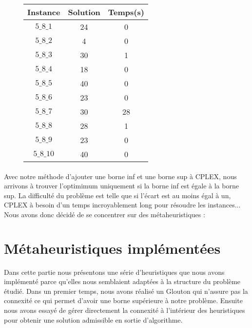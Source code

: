 \documentclass[a4paper, 11pt]{article} %
\begin{document}
\begin{center}
  \begin{figure}[H]
    \begin{tabular}{|c|c|c|}
      \hline 
      Instance & Solution & Temps(s) \\ \hline
      $5\_8\_1$ & 24 & 0 \\ \hline
      $5\_8\_2$ & 4 & 0 \\ \hline
      $5\_8\_3$ & 30 & 1 \\ \hline
      $5\_8\_4$ & 18 & 0 \\ \hline
      $5\_8\_5$ & 40 & 0 \\ \hline
      $5\_8\_6$ & 23 & 0 \\ \hline
      $5\_8\_7$ & 30 & 28 \\ \hline
      $5\_8\_8$ & 28 & 1 \\ \hline
      $5\_8\_9$ & 23 & 0 \\ \hline
      $5\_8\_10$  & 40 & 0 \\ \hline
      \end{tabular}
    \end{figure}
\end{center}


\paragraph*{}
Avec notre méthode d'ajouter une borne inf et une borne sup à CPLEX, nous arrivons à trouver l'optimimum uniquement si la borne inf est égale à la borne sup. La difficulté du problème est telle que si l'écart est au moins égal à un, CPLEX à besoin d'un temps incroyablement long pour résoudre les instances... Nous avons donc décidé de se concentrer sur des métaheuristiques :

\section{Métaheuristiques implémentées}

\paragraph*{}
Dans cette partie nous présentons une série d'heuristiques que nous avons implémenté parce qu'elles nous semblaient adaptées à la structure du problème étudié. Dans un premier temps, nous avons réalisé un Glouton qui n'assure pas la connexité ce qui permet d'avoir une borne supérieure à notre problème. Ensuite nous avons essayé de gérer directement la connexité à l'intérieur des heuristiques pour obtenir une solution admissible en sortie d'algorithme.
\end{document}
